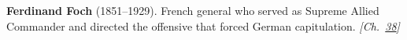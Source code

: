 \textbf{Ferdinand Foch} (1851–1929). French general who served as Supreme Allied Commander and directed the offensive that forced German capitulation. \emph{[Ch.~\hyperref[ch:christmastruce1914]{38}]}

